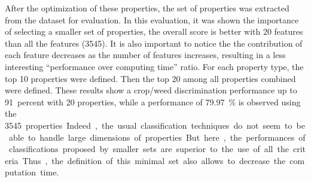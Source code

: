 \documentclass[../thesis.tex]{subfiles}
\begin{document}
    After the optimization of these properties, the set of properties was extracted from the dataset for evaluation. In this evaluation, it was shown the importance of selecting a smaller set of properties, the overall score is better with 20 features than all the features (3545). It is also important to notice the the contribution of each feature decreases as the number of features increases, resulting in a less interesting ``performance over computing time'' ratio. For each property type, the top 10 properties were defined. Then the top 20 among all properties combined were defined. These results show a crop/weed discrimination performance up to \SI{91}{percent} with 20 properties, while a performance of \SI{79.97}{\percent} is observed using the \SI{3545} properties. Indeed, the usual classification techniques do not seem to be able to handle large dimensions of properties. But here, the performances of classifications proposed by smaller sets are superior to the use of all the criteria. Thus, the definition of this minimal set also allows to decrease the computation time.
    
\end{document}
